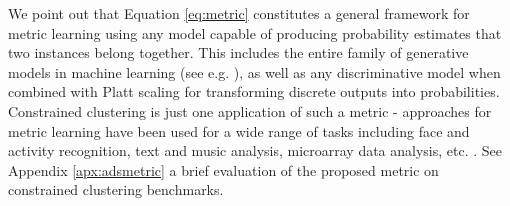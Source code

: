 We point out that Equation \ref{eq:metric} constitutes a general framework for metric learning using any model capable of producing probability estimates that two instances belong together. This includes the entire family of generative models in machine learning (see e.g. \citep{bishop2006pattern}), as well as any discriminative model when combined with Platt scaling \citep{platt1999probabilistic} for transforming discrete outputs into probabilities. Constrained clustering is just one application of such a metric - approaches for metric learning have been used for a wide range of tasks including face and activity recognition, text and music analysis, microarray data analysis, etc. \citep{kulis2012metric}. See Appendix \ref{apx:adsmetric} a brief evaluation of the proposed metric on constrained clustering benchmarks.








%
%
%
%
%
